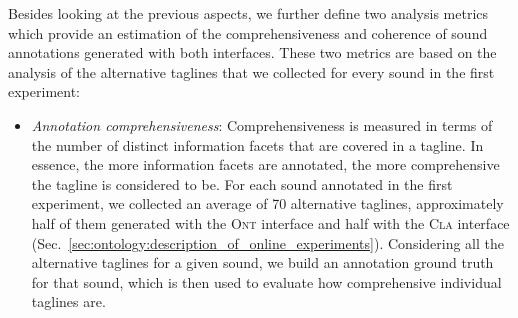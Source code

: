 Besides looking at the previous aspects, we further define two analysis metrics which provide an estimation of the comprehensiveness and coherence of sound annotations generated with both interfaces. These two metrics are based on the analysis of the alternative taglines that we collected for every sound in the first experiment: %

\begin{itemize}
\item \textit{Annotation comprehensiveness}: %
Comprehensiveness is measured in terms of the number of distinct information facets that are covered in a tagline. In essence, the more information facets are annotated, the more comprehensive the tagline is considered to be.
For each sound annotated in the first experiment, we collected an average of 70 alternative taglines, approximately half of them generated with the \textsc{Ont} interface and half with the \textsc{Cla} interface (Sec.~\ref{sec:ontology:description_of_online_experiments}).
Considering all the alternative taglines for a given sound, we build an annotation ground truth for that sound, which is then used to evaluate how comprehensive individual taglines are. 


\end{itemize}
